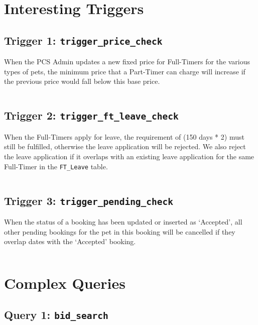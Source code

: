 \documentclass[10pt]{article}
\begin{document}
\section{Interesting Triggers}
\subsection{Trigger 1: \texttt{trigger\_price\_check}}
When the PCS Admin updates a new fixed price for Full-Timers for the various types of pets, the minimum price that a Part-Timer can charge will increase if the previous price would fall below this base price.
\begin{figure}[H]
\inputminted[breaklines, tabsize=8, obeytabs, fontsize=\footnotesize]{postgresql}{./codes/trigger_price_check.sql}
\end{figure}

\newpage
\subsection{Trigger 2: \texttt{trigger\_ft\_leave\_check}}
When the Full-Timers apply for leave, the requirement of (150 days * 2) must still be fulfilled, otherwise the leave application will be rejected. We also reject the leave application if it overlaps with an existing leave application for the same Full-Timer in the \texttt{FT\_Leave} table.
\begin{figure}[H]
\inputminted[breaklines, tabsize=8, obeytabs, fontsize=\footnotesize]{postgresql}{./codes/trigger_ft_leave_check.sql}
\end{figure}

\newpage
\subsection{Trigger 3: \texttt{trigger\_pending\_check}}
When the status of a booking has been updated or inserted as `Accepted', all other pending bookings for the pet in this booking will be cancelled if they overlap dates with the `Accepted' booking.
\begin{figure}[H]
\inputminted[breaklines, tabsize=8, obeytabs, fontsize=\footnotesize]{postgresql}{./codes/trigger_pending_check.sql}
\end{figure}


\section{Complex Queries}

\subsection{Query 1: \texttt{bid\_search}}
\begin{figure}[H]
\inputminted[breaklines, tabsize=8, obeytabs, fontsize=\footnotesize]{postgresql}{./codes/query_bid_search.sql}
\end{figure}
\end{document}
